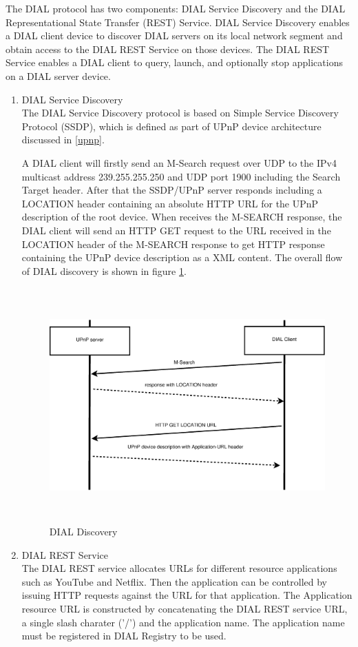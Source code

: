 The DIAL protocol has two components: DIAL Service Discovery and the DIAL
Representational State Transfer (REST) Service. DIAL Service Discovery enables a
DIAL client device to discover DIAL servers on its local network segment and
obtain access to the DIAL REST Service on those devices. The DIAL REST Service
enables a DIAL client to query, launch, and optionally stop applications on a
DIAL server device.
\begin{enumerate}
\item DIAL Service Discovery \\
The DIAL Service Discovery protocol is based on Simple Service Discovery
Protocol (SSDP), which is defined as part of UPnP device architecture discussed
in \ref{upnp}.

A DIAL client will firstly send an M-Search request over UDP to the IPv4
multicast address 239.255.255.250 and UDP port 1900 including the Search Target
header. After that the SSDP/UPnP server responds including a LOCATION header
containing an absolute HTTP URL for the UPnP description of the root device.
When receives the M-SEARCH response, the DIAL client will send an HTTP GET
request to the URL received in the LOCATION header of the M-SEARCH response to
get HTTP response containing the UPnP device description as a XML content. The
overall flow of DIAL discovery is shown in figure \ref{dial_discovery}.

\begin{figure}[htb] \centering
\includegraphics[height=9cm]{charts/dial_discovery}
\caption{DIAL Discovery \label{dial_discovery}}
\end{figure}

\item DIAL REST Service \\
The DIAL REST service allocates URLs for different resource applications such as
YouTube and Netflix. Then the application can be controlled by issuing HTTP
requests against the URL for that application. The Application resource URL is
constructed by concatenating the DIAL REST service URL, a single slash charater
('/') and the application name. The application name must be registered in DIAL
Registry to be used.


\end{enumerate}
